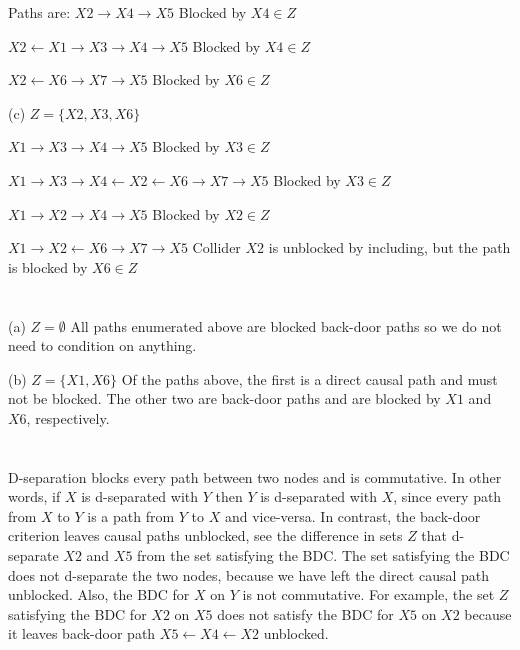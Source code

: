 \documentclass{article}
\begin{document}
\noindent Paths are: $X2 \rightarrow X4 \rightarrow X5$ Blocked by $X4 \in Z$

\noindent $X2 \leftarrow X1 \rightarrow X3 \rightarrow X4 \rightarrow X5$ Blocked by $X4 \in Z$

\noindent $X2 \leftarrow X6 \rightarrow X7 \rightarrow X5$ Blocked by $X6 \in Z$

\noindent (c) $Z = \{X2, X3, X6\} $

\noindent $X1 \rightarrow X3 \rightarrow X4 \rightarrow X5$ Blocked by $X3 \in Z$

\noindent $X1 \rightarrow X3 \rightarrow X4 \leftarrow X2 \leftarrow X6 \rightarrow X7 \rightarrow X5$ Blocked by $X3 \in Z$

\noindent $X1 \rightarrow X2 \rightarrow X4 \rightarrow X5$ Blocked by $X2 \in Z$

\noindent $X1 \rightarrow X2 \leftarrow X6 \rightarrow X7 \rightarrow X5$ Collider $X2$ is unblocked by including, but the path is blocked by $X6 \in Z$

\section{}
\noindent (a) $Z = \emptyset$ All paths enumerated above are blocked back-door paths so we do not need to condition on anything.

\noindent (b) $Z = \{X1, X6\}$ Of the paths above, the first is a direct causal path and must not be blocked. The other two are back-door paths and are blocked by $X1$ and $X6$, respectively.

\section{}
D-separation blocks every path between two nodes and is commutative. In other words, if $X$ is d-separated with $Y$ then $Y$ is d-separated with $X$, since every path from $X$ to $Y$ is a path from $Y$ to $X$ and vice-versa. In contrast, the back-door criterion leaves causal paths unblocked, see the difference in sets $Z$ that d-separate $X2$ and $X5$ from the set satisfying the BDC. The set satisfying the BDC does not d-separate the two nodes, because we have left the direct causal path unblocked. Also, the BDC for $X$ on $Y$ is not commutative. For example, the set $Z$ satisfying the BDC for $X2$ on $X5$ does not satisfy the BDC for $X5$ on $X2$ because it leaves back-door path $X5 \leftarrow X4 \leftarrow X2$ unblocked.

\section{}
\end{document}
